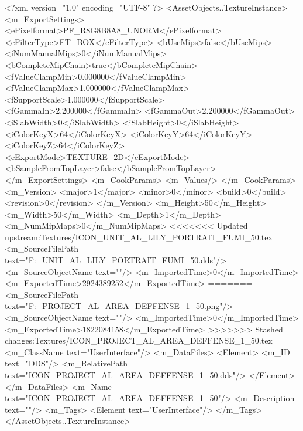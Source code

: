 <?xml version="1.0" encoding="UTF-8" ?>
<AssetObjects..TextureInstance>
	<m_ExportSettings>
		<ePixelformat>PF_R8G8B8A8_UNORM</ePixelformat>
		<eFilterType>FT_BOX</eFilterType>
		<bUseMips>false</bUseMips>
		<iNumManualMips>0</iNumManualMips>
		<bCompleteMipChain>true</bCompleteMipChain>
		<fValueClampMin>0.000000</fValueClampMin>
		<fValueClampMax>1.000000</fValueClampMax>
		<fSupportScale>1.000000</fSupportScale>
		<fGammaIn>2.200000</fGammaIn>
		<fGammaOut>2.200000</fGammaOut>
		<iSlabWidth>0</iSlabWidth>
		<iSlabHeight>0</iSlabHeight>
		<iColorKeyX>64</iColorKeyX>
		<iColorKeyY>64</iColorKeyY>
		<iColorKeyZ>64</iColorKeyZ>
		<eExportMode>TEXTURE_2D</eExportMode>
		<bSampleFromTopLayer>false</bSampleFromTopLayer>
	</m_ExportSettings>
	<m_CookParams>
		<m_Values/>
	</m_CookParams>
	<m_Version>
		<major>1</major>
		<minor>0</minor>
		<build>0</build>
		<revision>0</revision>
	</m_Version>
	<m_Height>50</m_Height>
	<m_Width>50</m_Width>
	<m_Depth>1</m_Depth>
	<m_NumMipMaps>0</m_NumMipMaps>
<<<<<<< Updated upstream:Textures/ICON_UNIT_AL_LILY_PORTRAIT_FUMI_50.tex
	<m_SourceFilePath text="F:\DT\lilyimages\gpportrait\ICON_UNIT_AL_LILY_PORTRAIT_FUMI_50.dds"/>
	<m_SourceObjectName text=""/>
	<m_ImportedTime>0</m_ImportedTime>
	<m_ExportedTime>2924389252</m_ExportedTime>
=======
	<m_SourceFilePath text="F:\DT\lilyimages\all\ICON_PROJECT_AL_AREA_DEFFENSE_1_50.png"/>
	<m_SourceObjectName text=""/>
	<m_ImportedTime>0</m_ImportedTime>
	<m_ExportedTime>1822084158</m_ExportedTime>
>>>>>>> Stashed changes:Textures/ICON_PROJECT_AL_AREA_DEFFENSE_1_50.tex
	<m_ClassName text="UserInterface"/>
	<m_DataFiles>
		<Element>
			<m_ID text="DDS"/>
			<m_RelativePath text="ICON_PROJECT_AL_AREA_DEFFENSE_1_50.dds"/>
		</Element>
	</m_DataFiles>
	<m_Name text="ICON_PROJECT_AL_AREA_DEFFENSE_1_50"/>
	<m_Description text=""/>
	<m_Tags>
		<Element text="UserInterface"/>
	</m_Tags>
</AssetObjects..TextureInstance>


